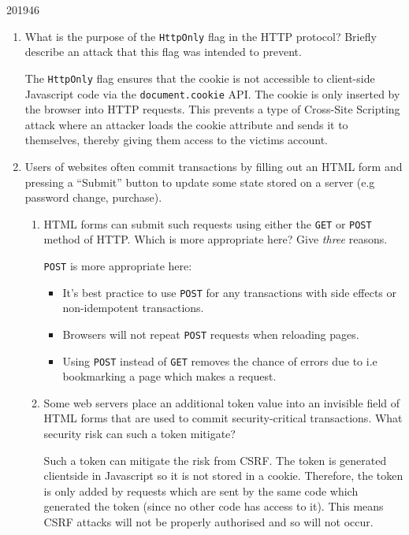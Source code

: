 \documentclass[10pt,\jkfside,a4paper]{article}
\begin{document}
\begin{examquestion}{2019}{4}{6}

\begin{enumerate}[label=(\alph*)]

\item What is the purpose of the \texttt{HttpOnly} flag in the HTTP
protocol? Briefly describe an attack that this flag was intended to prevent.

The \texttt{HttpOnly} flag ensures that the cookie is not accessible to
client-side Javascript code via the \texttt{document.cookie} API\@. The
cookie is only inserted by the browser into HTTP requests. This prevents
a type of Cross-Site Scripting attack where an attacker loads the cookie
attribute and sends it to themselves, thereby giving them access to the
victims account.

\item Users of websites often commit transactions by filling out an HTML
form and pressing a ``Submit'' button to update some state stored on a
server (e.g password change, purchase).

\begin{enumerate}[label=(\roman*)]

\item HTML forms can submit such requests using either the \texttt{GET} or
\texttt{POST} method of HTTP\@. Which is more appropriate here? Give
\textit{three} reasons.

\texttt{POST} is more appropriate here:
\begin{itemize}

\item It's best practice to use \texttt{POST} for any transactions with side
effects or non-idempotent transactions.

\item Browsers will not repeat \texttt{POST} requests when reloading pages.

\item Using \texttt{POST} instead of \texttt{GET} removes the chance of
errors due to i.e bookmarking a page which makes a request.

\end{itemize}

\item Some web servers place an additional token value into an invisible
field of HTML forms that are used to commit security-critical transactions.
What security risk can such a token mitigate?

Such a token can mitigate the risk from CSRF\@. The token is generated
clientside in Javascript so it is not stored in a cookie. Therefore, the
token is only added by requests which are sent by the same code which
generated the token (since no other code has access to it). This means CSRF
attacks will not be properly authorised and so will not occur.


\end{enumerate}
\end{enumerate}
\end{examquestion}
\end{document}
